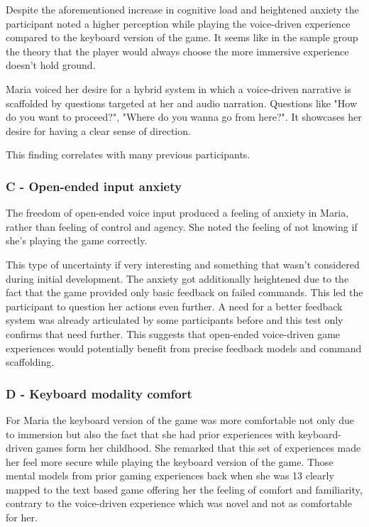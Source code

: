 Despite the aforementioned increase in cognitive load and heightened anxiety the participant noted a higher perception while playing the voice-driven experience compared to the keyboard version of the game. 
It seems like in the sample group the theory that the player would always choose the more immersive experience doesn't hold ground. 

Maria voiced her desire for a hybrid system in which a voice-driven narrative is scaffolded by questions targeted at her and audio narration. Questions like "How do you want to proceed?", "Where do you wanna go from here?". It showcases her desire for having a clear sense of direction. 



This finding correlates with many previous participants.


\subsubsection{C - Open-ended input anxiety}

The freedom of open-ended voice input produced a feeling of anxiety in Maria, rather than feeling of control and agency.
She noted the feeling of not knowing if she's playing the game correctly.

This type of uncertainty if very interesting and something that wasn't considered during initial development. 
The anxiety got additionally heightened due to the fact that the game provided only basic feedback on failed commands. This led the participant to question her actions even further. A need for a better feedback system was already articulated by some participants before and this test only confirms that need further. This suggests that open-ended voice-driven game experiences would potentially benefit from precise feedback models and command scaffolding.


\subsubsection{D - Keyboard modality comfort}

For Maria the keyboard version of the game was more comfortable not only due to immersion but also the fact that she had prior experiences with keyboard-driven games form her childhood. She remarked that this set of experiences made her feel more secure while playing the keyboard version of the game. Those mental models from prior gaming experiences back when she was 13 clearly mapped to the text based game offering her the feeling of comfort and familiarity, contrary to the voice-driven experience which was novel and not as comfortable for her. 

